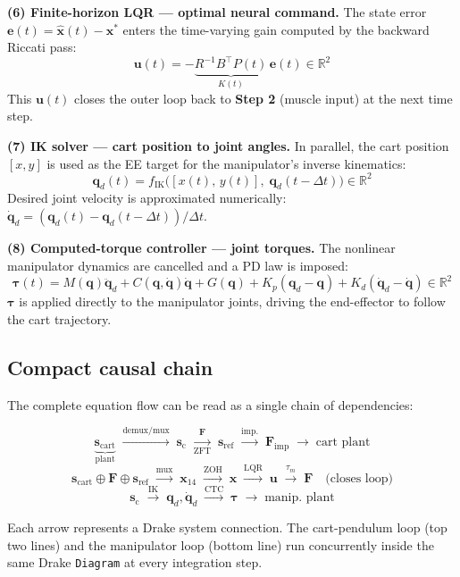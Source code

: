 \documentclass[11pt, a4paper]{article}
\begin{document}
\bigskip
\noindent\textbf{(6) Finite-horizon LQR — optimal neural command.}
The state error $\bm{e}(t) = \hat{\bm{x}}(t) - \bm{x}^{*}$ enters the
time-varying gain computed by the backward Riccati pass:
\[
\bm{u}(t) = -\underbrace{R^{-1}B^{\!\top}P(t)}_{K(t)}\,\bm{e}(t)
\in\mathbb{R}^2
\]
This $\bm{u}(t)$ closes the outer loop back to \textbf{Step 2} (muscle input)
at the next time step.

\bigskip
\noindent\textbf{(7) IK solver — cart position to joint angles.}
In parallel, the cart position $[x,y]$ is used as the EE target for the
manipulator's inverse kinematics:
\[
\bm{q}_d(t) = f_{\mathrm{IK}}\!\bigl([x(t),\,y(t)],\;\bm{q}_d(t{-}\Delta t)\bigr)
\in\mathbb{R}^2
\]
Desired joint velocity is approximated numerically:
$\dot{\bm{q}}_d = (\bm{q}_d(t) - \bm{q}_d(t{-}\Delta t))/\Delta t$.

\bigskip
\noindent\textbf{(8) Computed-torque controller — joint torques.}
The nonlinear manipulator dynamics are cancelled and a PD law is imposed:
\[
\bm{\tau}(t)
= M(\bm{q})\ddot{\bm{q}}_d
+ C(\bm{q},\dot{\bm{q}})\dot{\bm{q}}
+ G(\bm{q})
+ K_p(\bm{q}_d - \bm{q})
+ K_d(\dot{\bm{q}}_d - \dot{\bm{q}})
\in\mathbb{R}^2
\]
$\bm{\tau}$ is applied directly to the manipulator joints,
driving the end-effector to follow the cart trajectory.

\subsection*{Compact causal chain}

\noindent The complete equation flow can be read as a single chain of
dependencies:

\[
\underbrace{\bm{s}_{\mathrm{cart}}}_{\text{plant}}
\;\xrightarrow{\text{demux/mux}}\;
\bm{s}_{\mathrm{c}}
\;\xrightarrow[\text{ZFT}]{\bm{F}}\;
\bm{s}_{\mathrm{ref}}
\;\xrightarrow{\text{imp.}}\;
\bm{F}_{\mathrm{imp}}
\;\longrightarrow\;
\text{cart plant}
\]
\[
\bm{s}_{\mathrm{cart}} \oplus \bm{F} \oplus \bm{s}_{\mathrm{ref}}
\;\xrightarrow{\text{mux}}\;
\bm{x}_{14}
\;\xrightarrow{\text{ZOH}}\;
\hat{\bm{x}}
\;\xrightarrow{\text{LQR}}\;
\bm{u}
\;\xrightarrow{\tau_m}\;
\bm{F}
\quad\text{(closes loop)}
\]
\[
\bm{s}_{\mathrm{c}}
\;\xrightarrow{\text{IK}}\;
\bm{q}_d, \dot{\bm{q}}_d
\;\xrightarrow{\text{CTC}}\;
\bm{\tau}
\;\longrightarrow\;
\text{manip.\ plant}
\]

\noindent Each arrow represents a Drake system connection.
The cart-pendulum loop (top two lines) and the manipulator loop (bottom line)
run concurrently inside the same Drake \texttt{Diagram} at every integration
step.
\end{document}
